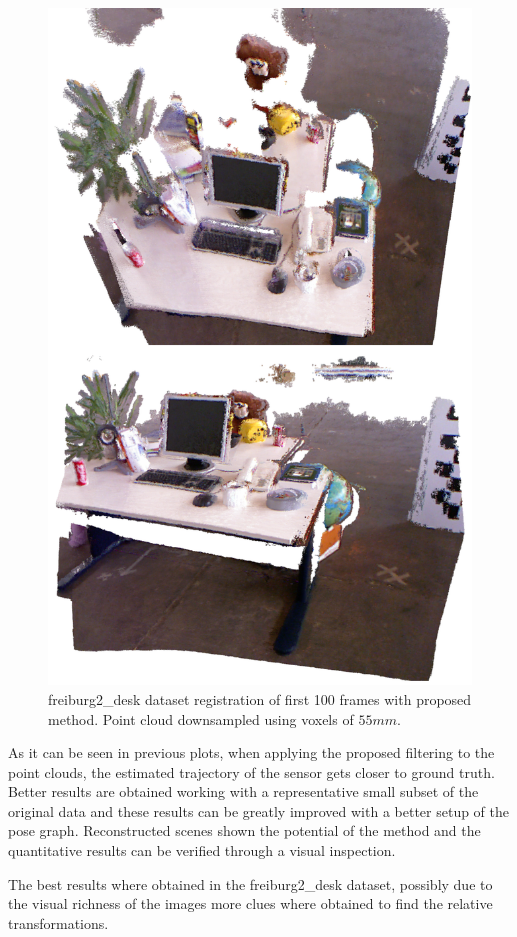 \begin{figure}[H]
\begin{center}
\includegraphics[scale=0.27]{images/freiburg2_desk.png}
\caption{freiburg2\_desk dataset registration of first 100 frames with proposed method. Point cloud downsampled using voxels of $55mm$.}
\end{center}
\end{figure}


As it can be seen in previous plots, when applying the proposed filtering to the point clouds, the estimated trajectory of the sensor gets 
closer to ground truth. Better results are obtained working with a representative small subset of the original data and these results 
can be greatly improved with a better setup of the pose graph. Reconstructed scenes shown the potential of the method and the quantitative 
results can be verified through a visual inspection. 

The best results where obtained in the freiburg2\_desk dataset, possibly due to the visual richness of the images more clues where obtained 
to find the relative transformations.
